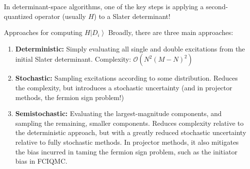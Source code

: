 \documentclass[amsmath]{beamer}
\begin{document}
\begin{frame}
	\small
	In determinant-space algorithms, one of the key steps is applying a second-quantized operator (usually $H$) to a Slater determinant!
	\begin{enumerate}
	\end{enumerate}
\end{frame}

\begin{frame}{Approaches for computing $H\left|D_i\right\rangle$}
	\small
	Broadly, there are three main approaches:
	\begin{enumerate}
		\item {\bf Deterministic:} Simply evaluating all single and double excitations from the initial Slater determinant. Complexity: $\mathcal{O}(N^2 (M-N)^2)$
		\item {\bf Stochastic:} Sampling excitations according to some distribution. Reduces the complexity, but introduces a stochastic uncertainty (and in projector methods, the fermion sign problem!)
		\item {\bf Semistochastic:} Evaluating the largest-magnitude components, and sampling the remaining, smaller components. Reduces complexity relative to the deterministic approach, but with a greatly reduced stochastic uncertainty relative to fully stochastic methods. In projector methods, it also mitigates the bias incurred in taming the fermion sign problem, such as the initiator bias in FCIQMC.
	\end{enumerate}
\end{frame}
\end{document}

